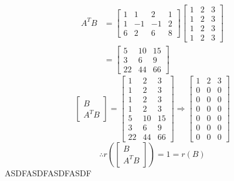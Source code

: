 \begin{align*}
    A^TB&=\begin{bmatrix}
        1&1&2&1\\
        1&-1&-1&2\\
        6&2&6&8
    \end{bmatrix}\begin{bmatrix}
        1&2&3\\
        1&2&3\\
        1&2&3\\
        1&2&3
    \end{bmatrix}\\
    &=\begin{bmatrix}
        5&10&15\\
        3&6&9\\
        22&44&66
    \end{bmatrix}
\end{align*}
$$\begin{bmatrix}
    B\\
    A^TB
\end{bmatrix}=\begin{bmatrix}
    1&2&3\\
    1&2&3\\
    1&2&3\\
    1&2&3\\
    5&10&15\\
    3&6&9\\
    22&44&66
\end{bmatrix}\Rightarrow\begin{bmatrix}
    1&2&3\\
    0&0&0\\
    0&0&0\\
    0&0&0\\
    0&0&0\\
    0&0&0\\
    0&0&0
\end{bmatrix}$$
$$\therefore r\left(\begin{bmatrix}
    B\\A^TB
\end{bmatrix}\right)=1=r(B)$$
ASDFASDFASDFASDF\\

